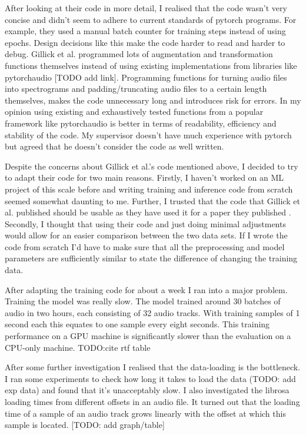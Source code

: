 \documentclass[bsc,frontabs,parskip,deptreport]{infthesis}
\begin{document}
After looking at their code in more detail,  
I realised that the code wasn't very concise and didn't seem to adhere to current standards of pytorch programs. 
For example, they used a manual batch counter for training steps instead of using epochs.  
Design decisions like this make the code harder to read and harder to debug. 
Gillick et al. programmed lots of augmentation and transformation functions themselves instead of using existing implementations from libraries like pytorchaudio [TODO add link]. 
Programming functions for turning audio files into spectrograms and padding/truncating audio files to a certain length themselves, makes the code unnecessary long and introduces risk for errors. In my opinion using existing and exhaustively tested functions from a popular framework like pytorchaudio is better in terms of readability, efficiency and stability of the code.
My supervisor doesn't have much experience with pytorch but agreed that he doesn't consider the code as well written.

Despite the concerns about Gillick et al.'s code mentioned above, I decided to try to adapt their code for two main reasons. 
Firstly, I haven't worked on an ML project of this scale before and writing training and inference code from scratch seemed somewhat daunting to me. Further, I trusted that the code that Gillick et al. published should be usable as they have used it for a paper they published \cite{gillick2021robust}. 
Secondly, I thought that using their code and just doing minimal adjustments would allow for an easier comparison between the two data sets. If I wrote the code from scratch I'd have to make sure that all the preprocessing and model parameters are sufficiently similar to state the difference of changing the training data. 

After adapting the training code for about a week I ran into a major problem. Training the model was really slow. The model trained around 30 batches of audio in two hours, each consisting of 32 audio tracks. 
With training samples of 1 second each this equates to one sample every eight seconds.
This training performance on a GPU machine is significantly slower than the evaluation on a CPU-only machine. TODO:cite rtf table

After some further investigation I realised that the data-loading is the bottleneck. I ran some experiments to check how long it takes to load the data (TODO: add exp data) and found that it's unacceptably slow. 
I also investigated the librosa loading times from different offsets in an audio file. It turned out that the loading time of a sample of an audio track grows linearly with the offset at which this sample is located. [TODO: add graph/table]
\end{document}
